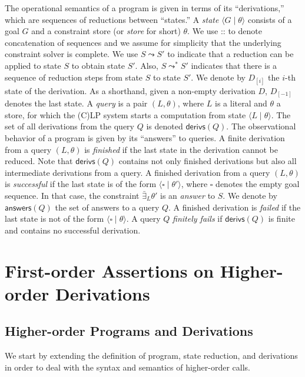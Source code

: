 \documentclass{llncs}
\newcommand{\gd}[0]{\mid}
\newcommand{\state}[2]
  {\ensuremath{\langle #1 \gd{} #2 \rangle}}
\newcommand{\emptyGoal}{\ensuremath{\square}}
\newcommand{\answers}[1]{\ensuremath{\textsf{answers}(#1)}}
\newcommand{\currstate}[1]{\ensuremath{{#1}_{[-1]}}}
\newcommand{\nthstate}[2]{\ensuremath{{#1}_{[#2]}}}
\newcommand{\reduction}[2]
  {\ensuremath{#1 \leadsto #2}}
\newcommand{\reductionStar}[2]
  {\ensuremath{#1 \leadsto^* #2}}
\newcommand{\derivations}[1]
  {\ensuremath{\textsf{derivs}(#1)}}
\begin{document}
The operational semantics of a program is given in terms of its
``derivations,'' which are sequences of reductions between ``states.'' 
A \emph{state} $\state{G}{\theta}$ consists of a goal $G$ and a
constraint store (or \emph{store} for short) $\theta$.
We use :: to denote concatenation of sequences and we assume for
simplicity that the underlying constraint solver is complete.
We use $\reduction{S}{S'}$ to indicate that a reduction can be applied
to state $S$ to obtain state $S'$. Also, $\reductionStar{S}{S'}$
indicates that there is a sequence of reduction steps from state $S$
to state $S'$.
We denote by $\nthstate{D}{i}$ the $i$-th state of the derivation. As
a shorthand, given a non-empty derivation $D$, $\currstate{D}$ denotes 
the last state.
A \emph{query} is a pair $(L,\theta)$, where $L$ is a literal and
$\theta$ a store, for which the (C)LP system starts a computation from
state $\state{L}{\theta}$.
The set of all derivations from the query $Q$ is denoted
$\derivations{Q}$.
The observational behavior of a program is given by its ``answers'' to
queries. A finite derivation from a query $(L,\theta)$ is
\emph{finished} if the last state in the derivation cannot be
reduced. 
Note that $\derivations{Q}$ contains not only finished derivations but
also all intermediate derivations from a query.
A finished derivation from a query $(L,\theta)$ is
\emph{successful} if the last state is of the form
$\state{\emptyGoal}{\theta'}$, where $\emptyGoal$ denotes the empty
goal sequence. In that case, the constraint $\bar{\exists}_{L}\theta'$
is an \emph{answer} to $S$.
We denote by $\answers{Q}$ the set of answers to a query $Q$.
A finished derivation is \emph{failed} if the last state is not of the
form $\state{\emptyGoal}{\theta}$.
A query $Q$ \emph{finitely fails} if $\derivations{Q}$ is
finite and contains no successful derivation.



\section{First-order Assertions on Higher-order Derivations}
\label{sec:fo-ho}



\subsection{Higher-order Programs and Derivations}

We start by extending the definition of program, state reduction,
and derivations in order to deal with the syntax and semantics of
higher-order calls.
 
\end{document}
